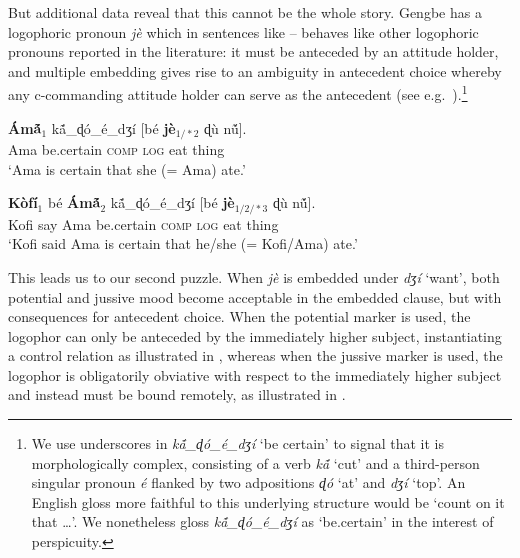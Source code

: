 \documentclass[output=paper,modfonts,nonflat]{langsci/langscibook}
\newcommand{\Z}{ʒ}
\newcommand{\D}{ɖ}
\newcommand{\á}{\'{ã}}
\newcommand{\É}{\'{\~{ε}}}
\newcommand{\È}{\`{\~{ε}}}
\newcommand{\í}{\'{\~{i}}}
\newcommand{\ì}{\`{\~{i}}}
\newcommand{\Ó}{\'{\~{ɔ}}}
\newcommand{\Ò}{\`{\~{ɔ}}}
\newcommand{\ú}{\'{ũ}}
\newcommand{\ù}{\`{ũ}}
\begin{document}
But additional data reveal that this cannot be the whole story. Gengbe has a logophoric pronoun \emph{ j\`e} which in sentences like -- behaves like other logophoric pronouns reported in the literature: it must be anteceded by an attitude holder, and multiple embedding gives rise to an ambiguity in antecedent choice whereby any c-commanding attitude holder can serve as the antecedent (see e.g.~\citealt{Clements1975, Pearson2015}).\footnote{We use underscores in \emph{k\'{\~a}\_{\D}\'o\_\'e\_d{\Z}\'i} `be certain' to signal that it is morphologically complex, consisting of a verb \emph{k\'{\~a}} `cut' and a third-person singular pronoun  \emph{\'e} flanked by two adpositions \emph{{\D}\'o} `at' and \emph{d{\Z}\'i} `top'. An English gloss more faithful to this underlying structure would be `count on it that
\ldots'.  We nonetheless gloss  \emph{k\'{\~a}\_{\D}\'o\_\'e\_d{\Z}\'i}  as `be.certain' in the interest of perspicuity. }

\ea
\gll  \textbf{\'Am\'{\~a}$_{1}$} k\'{\~a}\_{\D}\'o\_\'e\_d{\Z}\'i [b\'e \textbf{j\`e$_{1/*2}$}  {\D}\`u n\'{\~u}].\\
Ama be.certain \textsc{comp} \textsc{log}  eat thing\\
\glt `Ama is certain that she (= Ama)  ate.' \label{ex:grano:bl:11}
\z

\ea 
\gll \textbf{K\`of\'i$_{1}$} b\'e \textbf{\'Am\'{\~a}$_{2}$} k\'{\~a}\_{\D}\'o\_\'e\_d{\Z}\'i [b\'e \textbf{j\`e$_{1/2/*3}$}  {\D}\`u n\'{\~u}].\\
Kofi say Ama be.certain \textsc{comp} \textsc{log}  eat thing\\
\glt `Kofi said Ama is certain that he/she (= Kofi/Ama)  ate.' \label{ex:grano:bll:12}
\z

This leads us to our second puzzle. When \emph{ j\`e} is embedded under  \emph{d{\Z}\'i} `want', both potential and jussive mood become acceptable in the embedded clause, but with consequences for antecedent choice. When the potential marker is used, the logophor can only be anteceded by the immediately higher subject, instantiating a control relation as illustrated in , whereas when the jussive marker is used, the logophor is obligatorily obviative with respect to the immediately higher subject and instead must be bound remotely, as illustrated in .
\end{document}
